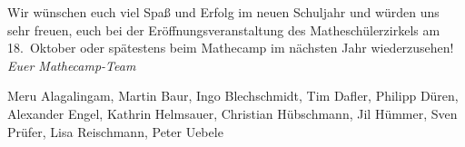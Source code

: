 \documentclass[12pt]{zettel}
\begin{document}
Wir wünschen euch viel Spaß und Erfolg im neuen Schuljahr und würden uns
sehr freuen, euch bei der Eröffnungsveranstaltung des Matheschülerzirkels am
18.~Oktober oder spätestens beim Mathecamp im nächsten Jahr wiederzusehen!
\emph{Euer Mathecamp-Team}

{\small Meru Alagalingam, Martin Baur, Ingo Blechschmidt, Tim Dafler, Philipp Düren,
Alexander Engel, Kathrin Helmsauer,
Christian Hübschmann, Jil Hümmer, Sven Prüfer,
Lisa Reischmann, Peter Uebele}
\end{document}
